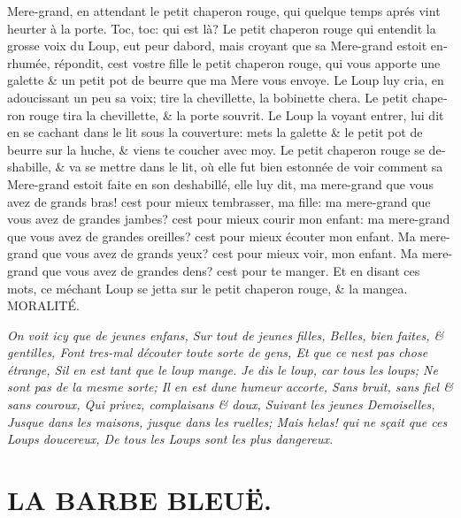 \documentclass[14pt,a4paper]{memoir}
\begin{document}
\begin{otherlanguage}{french}
Mere-grand, en attendant le petit chaperon rouge, qui quelque temps
aprés vint heurter à la porte. Toc, toc: qui est là? Le petit chaperon
rouge qui entendit la grosse voix du Loup, eut peur
d\textquotesingle abord, mais croyant que sa Mere-grand estoit enrhumée,
répondit, c\textquotesingle est vostre fille le petit chaperon rouge,
qui vous apporte une galette \& un petit pot de beurre que ma Mere vous
envoye. Le Loup luy cria, en adoucissant un peu sa voix; tire la
chevillette, la bobinette chera. Le petit chaperon rouge tira la
chevillette, \& la porte s\textquotesingle ouvrit. Le Loup la voyant
entrer, lui dit en se cachant dans le lit sous la couverture: mets la
galette \& le petit pot de beurre sur la huche, \& viens te coucher avec
moy. Le petit chaperon rouge se deshabille, \& va se mettre dans le lit,
où elle fut bien estonnée de voir comment sa Mere-grand estoit faite en
son deshabillé, elle luy dit, ma mere-grand que vous avez de grands
bras! c\textquotesingle est pour mieux t\textquotesingle embrasser, ma
fille: ma mere-grand que vous avez de grandes jambes?
c\textquotesingle est pour mieux courir mon enfant: ma mere-grand que
vous avez de grandes oreilles? c\textquotesingle est pour mieux écouter
mon enfant. Ma mere-grand que vous avez de grands yeux?
c\textquotesingle est pour mieux voir, mon enfant. Ma mere-grand que
vous avez de grandes dens? c\textquotesingle est pour te manger. Et en
disant ces mots, ce méchant Loup se jetta sur le petit chaperon rouge,
\& la mangea. \\

MORALITÉ.

\emph{{On voit icy que de jeunes enfans,} {Sur tout de jeunes filles,}
{Belles, bien faites, \& gentilles,} {Font tres-mal
d\textquotesingle écouter toute sorte de gens,} {Et que ce
n\textquotesingle est pas chose étrange,} {S\textquotesingle il en est
tant que le loup mange.} {Je dis le loup, car tous les loups;} {Ne sont
pas de la mesme sorte;} {Il en est d\textquotesingle une humeur
accorte,} {Sans bruit, sans fiel \& sans couroux,} {Qui privez,
complaisans \& doux,} {Suivant les jeunes Demoiselles,} {Jusque dans les
maisons, jusque dans les ruelles; } {Mais helas! qui ne sçait que ces
Loups doucereux, } {De tous les Loups sont les plus dangereux.}}


\section{LA BARBE BLEUË.}


\end{otherlanguage}
\end{document}
